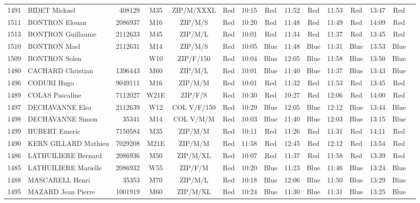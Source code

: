 \documentclass{report}
\begin{document}
\begin{longtable}{|c|l|r|c|c|*{5}{cc|}}
    1491 & BIDET Mickael & 408129 & M35 & ZIP/M/XXXL & Red & 10:15 & Red & 11:52 & Red & 11:53 & Red & 13:47 & Red &  \\
    1511 & BONTRON Elouan & 2086937 & M16 & ZIP/M/S & Red & 10:20 & Red & 11:48 & Red & 11:49 & Red & 14:09 & Red &  \\
    1513 & BONTRON Guillaume & 2112633 & M45 & ZIP/M/L & Red & 10:01 & Red & 11:34 & Red & 11:37 & Red & 13:45 & Red &  \\
    1510 & BONTRON Mael & 2112631 & M14 & ZIP/M/S & Red & 10:05 & Blue & 11:48 & Blue & 11:31 & Blue & 13:53 & Blue &  \\
    1509 & BONTRON Solen &  & W10 & ZIP/F/150 & Red & 10:04 & Blue & 12:05 & Blue & 11:58 & Blue & 13:50 & Blue &  \\
    1480 & CACHARD Christian & 1396443 & M60 & ZIP/M/L & Red & 10:01 & Blue & 11:40 & Blue & 11:37 & Blue & 13:43 & Blue &  \\
    1496 & CODURI Hugo & 9049111 & M16 & ZIP/M/M & Red & 10:01 & Red & 11:32 & Red & 11:53 & Red & 13:45 & Red &  \\
    1489 & COLAS Pascaline & 7112027 & W21E & ZIP/F/S & Red & 10:30 & Red & 10:27 & Red & 12:06 & Red & 14:00 & Red &  \\
    1497 & DECHAVANNE Elsa & 2112639 & W12 & COL V/F/150 & Red & 10:29 & Blue & 12:05 & Blue & 12:12 & Blue & 13:44 & Blue &  \\
    1498 & DECHAVANNE Simon & 35341 & M14 & COL V/M/M & Red & 10:03 & Blue & 11:40 & Blue & 12:03 & Blue & 13:15 & Blue &  \\
    1499 & HUBERT Emeric & 7150584 & M35 & ZIP/M/M & Red & 10:11 & Red & 11:26 & Red & 11:31 & Red & 14:11 & Red &  \\
    1490 & KERN GILLARD Mathieu & 7029208 & M21E & ZIP/M/M & Red & 11:58 & Red & 12:45 & Red & 12:12 & Red & 13:54 & Red &  \\
    1486 & LATHUILIERE Bernard & 2086936 & M50 & ZIP/M/XL & Red & 10:07 & Red & 11:37 & Red & 11:58 & Red & 13:39 & Red &  \\
    1485 & LATHUILIERE Marielle & 2086932 & W55 & ZIP/F/M & Red & 10:20 & Blue & 11:23 & Blue & 11:46 & Blue & 13:24 & Blue &  \\
    1488 & MASCARELL Henri & 35353 & M70 & ZIP/M/L & Red & 10:18 & Blue & 12:06 & Blue & 11:50 & Blue & 13:29 & Blue &  \\
    1495 & MAZARD Jean Pierre & 1001919 & M60 & ZIP/M/XL & Red & 10:24 & Blue & 11:30 & Blue & 11:31 & Blue & 13:25 & Blue &  \\

\end{longtable}
\end{document}
